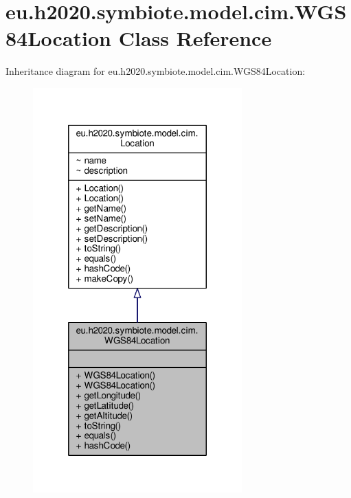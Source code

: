 \hypertarget{classeu_1_1h2020_1_1symbiote_1_1model_1_1cim_1_1WGS84Location}{}\section{eu.\+h2020.\+symbiote.\+model.\+cim.\+W\+G\+S84\+Location Class Reference}
\label{classeu_1_1h2020_1_1symbiote_1_1model_1_1cim_1_1WGS84Location}


Inheritance diagram for eu.\+h2020.\+symbiote.\+model.\+cim.\+W\+G\+S84\+Location\+:
\nopagebreak
\begin{figure}[H]
\begin{center}
\leavevmode
\includegraphics[width=228pt]{classeu_1_1h2020_1_1symbiote_1_1model_1_1cim_1_1WGS84Location__inherit__graph}
\end{center}
\end{figure}


